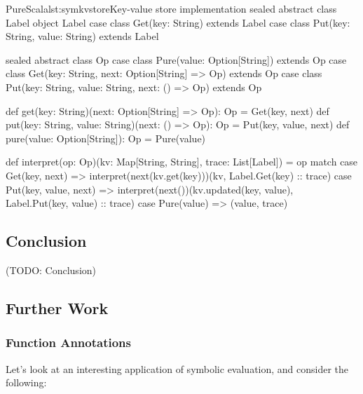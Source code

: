 \documentclass[a4paper,twoside]{article}
\newcommand{\TODO}[1]{\textcolor{YellowOrange}{(TODO: #1)}} %
\begin{document}
\begin{Code}{PureScala}{lst:symkvstore}{Key-value store implementation}
sealed abstract class Label
object Label {
  case class Get(key: String) extends Label
  case class Put(key: String, value: String) extends Label
}

sealed abstract class Op
case class Pure(value: Option[String]) extends Op
case class Get(key: String, next: Option[String] => Op) extends Op
case class Put(key: String, value: String, next: () => Op) extends Op

def get(key: String)(next: Option[String] => Op): Op = Get(key, next)
def put(key: String, value: String)(next: () => Op): Op = Put(key, value, next)
def pure(value: Option[String]): Op = Pure(value)

def interpret(op: Op)(kv: Map[String, String], trace: List[Label]) = op match {
  case Get(key, next) =>
  	interpret(next(kv.get(key)))(kv, Label.Get(key) :: trace)
  case Put(key, value, next) =>
  	interpret(next())(kv.updated(key, value), Label.Put(key, value) :: trace)
  case Pure(value) =>
  	(value, trace)
}
\end{Code}

\subsection{Conclusion}

\TODO{Conclusion}

\subsection{Further Work}

\subsubsection*{Function Annotations}

Let's look at an interesting application of symbolic evaluation, and consider the following:
\end{document}
